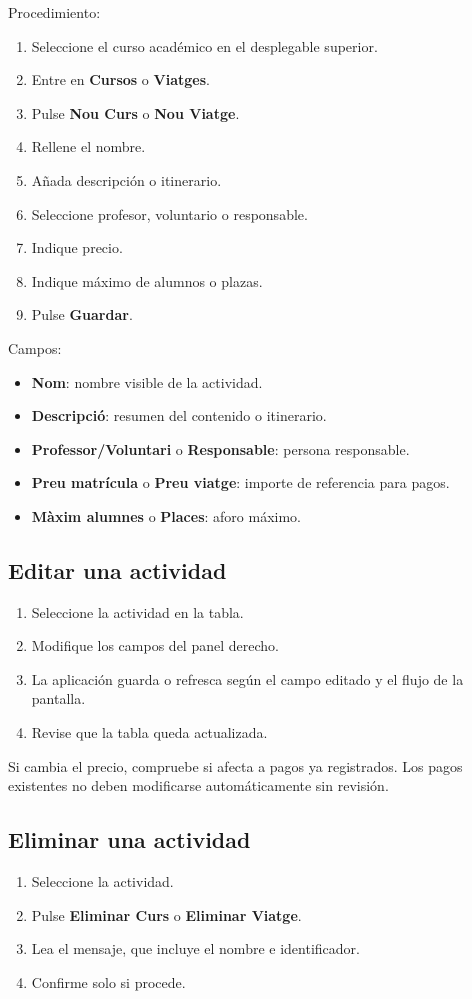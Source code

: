 \documentclass[12pt]{article}
\newcommand{\boton}[1]{\textbf{#1}}
\newcommand{\menu}[1]{\textbf{#1}}
\newcommand{\campo}[1]{\textbf{#1}}
\begin{document}
Procedimiento:
\begin{enumerate}
  \item Seleccione el curso académico en el desplegable superior.
  \item Entre en \menu{Cursos} o \menu{Viatges}.
  \item Pulse \boton{Nou Curs} o \boton{Nou Viatge}.
  \item Rellene el nombre.
  \item Añada descripción o itinerario.
  \item Seleccione profesor, voluntario o responsable.
  \item Indique precio.
  \item Indique máximo de alumnos o plazas.
  \item Pulse \boton{Guardar}.
\end{enumerate}

Campos:
\begin{itemize}
  \item \campo{Nom}: nombre visible de la actividad.
  \item \campo{Descripció}: resumen del contenido o itinerario.
  \item \campo{Professor/Voluntari} o \campo{Responsable}: persona responsable.
  \item \campo{Preu matrícula} o \campo{Preu viatge}: importe de referencia para pagos.
  \item \campo{Màxim alumnes} o \campo{Places}: aforo máximo.
\end{itemize}

\subsection{Editar una actividad}
\begin{enumerate}
  \item Seleccione la actividad en la tabla.
  \item Modifique los campos del panel derecho.
  \item La aplicación guarda o refresca según el campo editado y el flujo de la pantalla.
  \item Revise que la tabla queda actualizada.
\end{enumerate}

Si cambia el precio, compruebe si afecta a pagos ya registrados. Los pagos existentes no deben modificarse automáticamente sin revisión.

\subsection{Eliminar una actividad}
\begin{enumerate}
  \item Seleccione la actividad.
  \item Pulse \boton{Eliminar Curs} o \boton{Eliminar Viatge}.
  \item Lea el mensaje, que incluye el nombre e identificador.
  \item Confirme solo si procede.
\end{enumerate}
\end{document}
